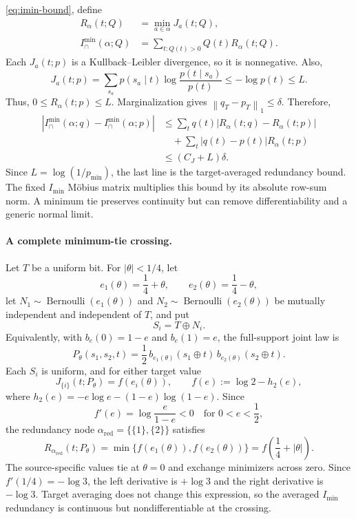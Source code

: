 \documentclass[11pt]{article}
\theoremstyle{definition}
\newcommand{\normone}[1]{\left\lVert #1\right\rVert_1}
\newcommand{\imin}{I_{\min}}
\begin{document}
\eqref{eq:imin-bound}, define
\begin{align}
  R_\alpha(t;Q)&=\min_{a\in\alpha}J_a(t;Q), \\
  I^{\min}_{\cap}(\alpha;Q)&=\sum_{t:Q(t)>0} Q(t)R_\alpha(t;Q).
\end{align}
Each $J_a(t;p)$ is a Kullback--Leibler divergence, so it is nonnegative.  Also,
\begin{equation}
  J_a(t;p)
  =\sum_{s_a}p(s_a\mid t)\log\frac{p(t\mid s_a)}{p(t)}
  \le -\log p(t)
  \le L.
\end{equation}
Thus, $0\le R_\alpha(t;p)\le L$.  Marginalization gives
$\normone{q_T-p_T}\le\delta$.  Therefore,
\begin{align}
  \left|I^{\min}_{\cap}(\alpha;q)-I^{\min}_{\cap}(\alpha;p)\right|
  &\le \sum_t q(t)|R_\alpha(t;q)-R_\alpha(t;p)| \\
  &\quad +\sum_t|q(t)-p(t)|R_\alpha(t;p) \\
  &\le (C_J+L)\delta.
\end{align}
Since $L=\log(1/p_{\min})$, the last line is the target-averaged redundancy bound.
The fixed $\imin$ M{\"o}bius matrix multiplies this bound by its absolute row-sum norm.  A minimum tie
preserves continuity but can remove differentiability and a generic normal limit.

\paragraph{A complete minimum-tie crossing.}
Let $T$ be a uniform bit.  For $|\theta|<1/4$, let
\[
  e_1(\theta)=\frac14+\theta,
  \qquad
  e_2(\theta)=\frac14-\theta,
\]
let $N_1\sim\operatorname{Bernoulli}(e_1(\theta))$ and
$N_2\sim\operatorname{Bernoulli}(e_2(\theta))$ be mutually independent and independent of $T$,
and put
\[
  S_i=T\mathbin{\oplus}N_i.
\]
Equivalently, with $b_e(0)=1-e$ and $b_e(1)=e$, the full-support joint law is
\[
  P_\theta(s_1,s_2,t)
  =\frac12\,b_{e_1(\theta)}(s_1\mathbin{\oplus}t)\,
             b_{e_2(\theta)}(s_2\mathbin{\oplus}t).
\]
Each $S_i$ is uniform, and for either target value
\[
  J_{\{i\}}(t;P_\theta)
  =f(e_i(\theta)),
  \qquad
  f(e):=\log2-h_2(e),
\]
where $h_2(e)=-e\log e-(1-e)\log(1-e)$.  Since
\[
  f'(e)=\log\frac{e}{1-e}<0
  \quad\text{for }0<e<\frac12,
\]
the redundancy node $\alpha_{\mathrm{red}}=\{\{1\},\{2\}\}$ satisfies
\[
  R_{\alpha_{\mathrm{red}}}(t;P_\theta)
  =\min\{f(e_1(\theta)),f(e_2(\theta))\}
  =f\!\left(\frac14+|\theta|\right).
\]
The source-specific values tie at $\theta=0$ and exchange minimizers across zero.  Since
$f'(1/4)=-\log3$, the left derivative is $+\log3$ and the right derivative is $-\log3$.
Target averaging does not change this expression, so the averaged $\imin$ redundancy is
continuous but nondifferentiable at the crossing.
\end{document}
